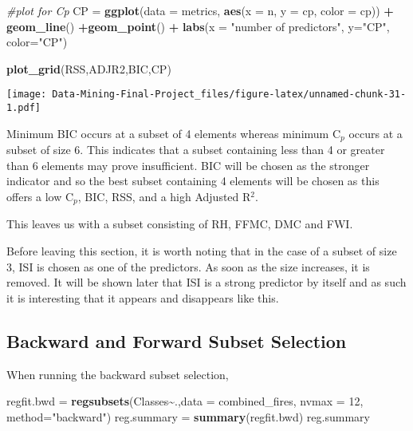 \documentclass[
]{article}
\newenvironment{Shaded}{\begin{snugshade}}{\end{snugshade}}
\newcommand{\AttributeTok}[1]{\textcolor[rgb]{0.13,0.29,0.53}{#1}}
\newcommand{\CommentTok}[1]{\textcolor[rgb]{0.56,0.35,0.01}{\textit{#1}}}
\newcommand{\DecValTok}[1]{\textcolor[rgb]{0.00,0.00,0.81}{#1}}
\newcommand{\FunctionTok}[1]{\textcolor[rgb]{0.13,0.29,0.53}{\textbf{#1}}}
\newcommand{\NormalTok}[1]{#1}
\newcommand{\OtherTok}[1]{\textcolor[rgb]{0.56,0.35,0.01}{#1}}
\newcommand{\SpecialCharTok}[1]{\textcolor[rgb]{0.81,0.36,0.00}{\textbf{#1}}}
\newcommand{\StringTok}[1]{\textcolor[rgb]{0.31,0.60,0.02}{#1}}
\begin{document}
\begin{Shaded}
\begin{Highlighting}[]
\CommentTok{\#plot for Cp}
\NormalTok{CP }\OtherTok{=} \FunctionTok{ggplot}\NormalTok{(}\AttributeTok{data =}\NormalTok{ metrics, }\FunctionTok{aes}\NormalTok{(}\AttributeTok{x =}\NormalTok{ n, }\AttributeTok{y =}\NormalTok{ cp, }\AttributeTok{color =}\NormalTok{ cp)) }\SpecialCharTok{+} \FunctionTok{geom\_line}\NormalTok{() }\SpecialCharTok{+}\FunctionTok{geom\_point}\NormalTok{() }\SpecialCharTok{+} \FunctionTok{labs}\NormalTok{(}\AttributeTok{x =} \StringTok{"number of predictors"}\NormalTok{, }\AttributeTok{y=}\StringTok{"CP"}\NormalTok{, }\AttributeTok{color=}\StringTok{"CP"}\NormalTok{)}

\FunctionTok{plot\_grid}\NormalTok{(RSS,ADJR2,BIC,CP)}
\end{Highlighting}
\end{Shaded}

\texttt{[image: Data-Mining-Final-Project\_files/figure-latex/unnamed-chunk-31-1.pdf]}

Minimum BIC occurs at a subset of 4 elements whereas minimum C\(_p\)
occurs at a subset of size 6. This indicates that a subset containing
less than 4 or greater than 6 elements may prove insufficient. BIC will
be chosen as the stronger indicator and so the best subset containing 4
elements will be chosen as this offers a low C\(_p\), BIC, RSS, and a
high Adjusted R\(^2\).

This leaves us with a subset consisting of RH, FFMC, DMC and FWI.

Before leaving this section, it is worth noting that in the case of a
subset of size 3, ISI is chosen as one of the predictors. As soon as the
size increases, it is removed. It will be shown later that ISI is a
strong predictor by itself and as such it is interesting that it appears
and disappears like this.

\subsection{Backward and Forward Subset
Selection}\label{backward-and-forward-subset-selection}

When running the backward subset selection,

\begin{Shaded}
\begin{Highlighting}[]
\NormalTok{regfit.bwd }\OtherTok{=} \FunctionTok{regsubsets}\NormalTok{(Classes}\SpecialCharTok{\textasciitilde{}}\NormalTok{.,}\AttributeTok{data =}\NormalTok{ combined\_fires, }\AttributeTok{nvmax =} \DecValTok{12}\NormalTok{, }\AttributeTok{method=}\StringTok{"backward"}\NormalTok{)}
\NormalTok{reg.summary }\OtherTok{=} \FunctionTok{summary}\NormalTok{(regfit.bwd)}
\NormalTok{reg.summary}
\end{Highlighting}
\end{Shaded}
\end{document}
